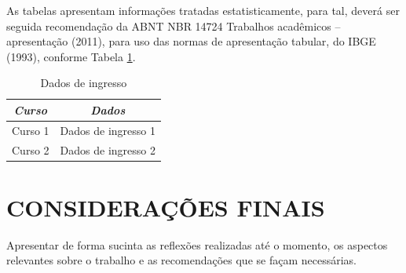 \documentclass{furgmpu}
\begin{document}
    As tabelas apresentam informações tratadas estatisticamente, para tal, deverá ser seguida recomendação da ABNT NBR 14724 Trabalhos acadêmicos – apresentação (2011), para uso das normas de apresentação tabular, do IBGE (1993), conforme Tabela \ref{tab:tabela}. 
    
    \begin{table}[ht]
        \centering
        \caption{Dados de ingresso}
        \begin{tabular}{cc}
            \toprule
            \textbf{\textit{Curso}}  & \textbf{\textit{Dados}} \\
            \midrule
            Curso 1 & Dados de ingresso 1\\
            Curso 2 & Dados de ingresso 2\\
            \bottomrule
        \end{tabular}
        \label{tab:tabela}
    \end{table}
    
    
    \section{CONSIDERAÇÕES FINAIS}
    Apresentar de forma sucinta as reflexões realizadas até o momento, os aspectos relevantes sobre o trabalho e as recomendações que se façam necessárias.
    

    
\end{document}
